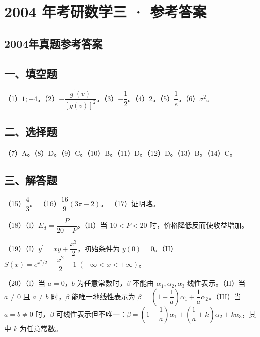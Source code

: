 \documentclass[UTF8,12pt]{ctexart}
\begin{document}
\section*{2004 年考研数学三 · 参考答案}
\subsection*{2004年真题参考答案}

\subsection*{一、填空题}

（1）\(\displaystyle 1;-4\)。（2）\(\displaystyle -\dfrac{\displaystyle g^{\prime}(v)}{\displaystyle [g(v)]^2}\)。（3）\(\displaystyle -\dfrac{\displaystyle 1}{\displaystyle 2}\)。（4）\(\displaystyle 2\)。（5）\(\displaystyle \dfrac{\displaystyle 1}{\displaystyle e}\)。（6）\(\displaystyle \sigma^2\)。


\subsection*{二、选择题}

（7）A。（8）D。（9）C。（10）B。（11）D。（12）D。（13）B。（14）C。


\subsection*{三、解答题}

（15）\(\displaystyle \dfrac{\displaystyle 4}{\displaystyle 3}\)。 （16）\(\displaystyle \dfrac{\displaystyle 16}{\displaystyle 9}(3\pi-2)\)。 （17）证明略。


（18）（I）\(\displaystyle E_d=\dfrac{\displaystyle P}{\displaystyle 20-P}\)。（II）当 \(\displaystyle 10<P<20\) 时，价格降低反而使收益增加。


（19）（I）\(\displaystyle y^{\prime}=xy+\dfrac{\displaystyle x^3}{\displaystyle 2}\)，初始条件为 \(\displaystyle y(0)=0\)。（II）\(\displaystyle S(x)=e^{x^2/2}-\dfrac{\displaystyle x^2}{\displaystyle 2}-1\;(-\infty<x<+\infty)\)。


（20）（I）当 \(\displaystyle a=0\)，\(\displaystyle b\) 为任意常数时，\(\displaystyle \beta\) 不能由 \(\displaystyle \alpha_1,\allowbreak \alpha_2,\allowbreak \alpha_3\) 线性表示。（II）当 \(\displaystyle a\ne0\) 且 \(\displaystyle a\ne b\) 时，\(\displaystyle \beta\) 能唯一地线性表示为 \(\displaystyle \beta=(1-\dfrac{\displaystyle 1}{\displaystyle a})\alpha_1+\dfrac{\displaystyle 1}{\displaystyle a}\alpha_2\)。（III）当 \(\displaystyle a=b\ne0\) 时，\(\displaystyle \beta\) 可线性表示但不唯一：\(\displaystyle \beta=(1-\dfrac{\displaystyle 1}{\displaystyle a})\alpha_1+(\dfrac{\displaystyle 1}{\displaystyle a}+k)\alpha_2+k\alpha_3\)，其中 \(\displaystyle k\) 为任意常数。
\end{document}
